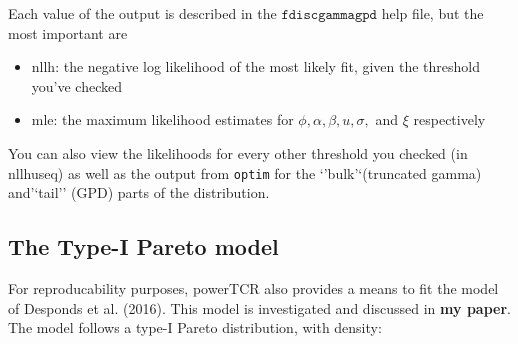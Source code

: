 \documentclass[]{article}
\providecommand{\tightlist}{%
  \setlength{\itemsep}{0pt}\setlength{\parskip}{0pt}}
\newcommand{\hlstd}[1]{\textcolor[rgb]{0.251,0.251,0.251}{#1}}%
\newenvironment{Shaded}{\begin{myshaded}}{\end{myshaded}}
\newcommand{\NormalTok}[1]{\hlstd{#1}}
\theoremstyle{definition}
\theoremstyle{definition}
\theoremstyle{definition}
\theoremstyle{remark}
\begin{document}
\begin{Shaded}
\end{Shaded}

Each value of the output is described in the \(\texttt{fdiscgammagpd}\)
help file, but the most important are

\begin{itemize}
\tightlist
\item
  nllh: the negative log likelihood of the most likely fit, given the
  threshold you've checked
\item
  mle: the maximum likelihood estimates for
  \(\phi, \alpha, \beta, u, \sigma,\) and \(\xi\) respectively
\end{itemize}

You can also view the likelihoods for every other threshold you checked
(in nllhuseq) as well as the output from \texttt{optim} for the
`'bulk'`(truncated gamma) and'`tail'' (GPD) parts of the distribution.

\subsection{The Type-I Pareto model}\label{the-type-i-pareto-model}

For reproducability purposes, powerTCR also provides a means to fit the
model of Desponds et al. (2016). This model is investigated and
discussed in \textbf{my paper}. The model follows a type-I Pareto
distribution, with density:
\end{document}
